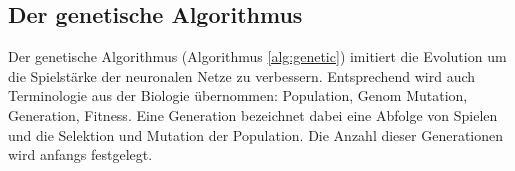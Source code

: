 %
% 

\subsection{Der genetische Algorithmus}

Der genetische Algorithmus (Algorithmus \ref{alg:genetic}) imitiert die
Evolution um die Spielstärke der neuronalen Netze zu verbessern. Entsprechend
wird auch Terminologie aus der Biologie übernommen: Population, Genom
Mutation, Generation, Fitness. Eine Generation bezeichnet dabei eine Abfolge
von Spielen und die Selektion und Mutation der Population. Die Anzahl dieser
Generationen wird anfangs festgelegt.

